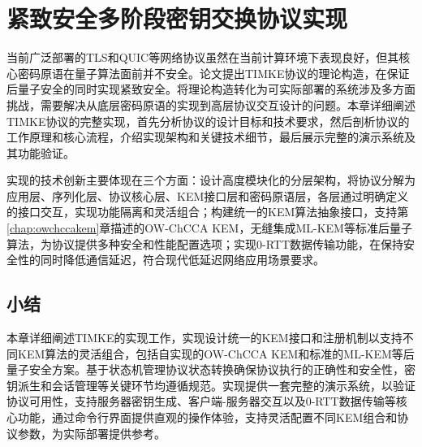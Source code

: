 \section{紧致安全多阶段密钥交换协议实现}

当前广泛部署的TLS和QUIC等网络协议虽然在当前计算环境下表现良好，但其核心密码原语在量子算法面前并不安全。论文\cite{timke_2024}提出TIMKE协议的理论构造，在保证后量子安全的同时实现紧致安全。将理论构造转化为可实际部署的系统涉及多方面挑战，需要解决从底层密码原语的实现到高层协议交互设计的问题。本章详细阐述TIMKE协议的完整实现，首先分析协议的设计目标和技术要求，然后剖析协议的工作原理和核心流程，介绍实现架构和关键技术细节，最后展示完整的演示系统及其功能验证。

实现的技术创新主要体现在三个方面：设计高度模块化的分层架构，将协议分解为应用层、序列化层、协议核心层、KEM接口层和密码原语层，各层通过明确定义的接口交互，实现功能隔离和灵活组合；构建统一的KEM算法抽象接口，支持第\ref{chap:owchccakem}章描述的OW-ChCCA KEM，无缝集成ML-KEM等标准后量子算法，为协议提供多种安全和性能配置选项；实现0-RTT数据传输功能，在保持安全性的同时降低通信延迟，符合现代低延迟网络应用场景要求。






\subsection{小结}

本章详细阐述TIMKE的实现工作，实现设计统一的KEM接口和注册机制以支持不同KEM算法的灵活组合，包括自实现的OW-ChCCA KEM和标准的ML-KEM等后量子安全方案。基于状态机管理协议状态转换确保协议执行的正确性和安全性，密钥派生和会话管理等关键环节均遵循规范。实现提供一套完整的演示系统，以验证协议可用性，支持服务器密钥生成、客户端-服务器交互以及0-RTT数据传输等核心功能，通过命令行界面提供直观的操作体验，支持灵活配置不同KEM组合和协议参数，为实际部署提供参考。

